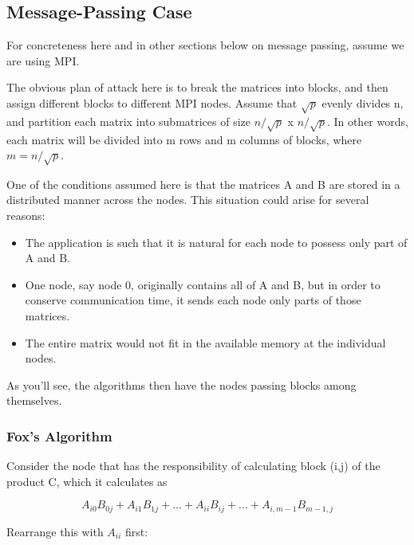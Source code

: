 \subsection{Message-Passing Case}

For concreteness here and in other sections below on message passing,
assume we are using MPI.

The obvious plan of attack here is to break the matrices into blocks,
and then assign different blocks to different MPI nodes.  Assume that
$\sqrt{p}$ evenly divides n, and partition each matrix into submatrices of
size $n/\sqrt{p}$ x $n/\sqrt{p}$.  In other words, each matrix will be
divided into m rows and m columns of blocks, where $m = n/\sqrt{p}$.

One of the conditions assumed here is that the matrices A and B are
stored in a distributed manner across the nodes.  This situation could
arise for several reasons:

\begin{itemize}

   \item The application is such that it is natural for each node to
   possess only part of A and B.

   \item One node, say node 0, originally contains all of A and B, but
   in order to conserve communication time, it sends each node only
   parts of those matrices.

   \item The entire matrix would not fit in the available memory at the
   individual nodes.

\end{itemize}

As you'll see, the algorithms then have the nodes passing blocks among
themselves.

\subsubsection{Fox's Algorithm}
\label{matmult}

Consider the node that has the responsibility of calculating block (i,j) 
of the product C, which it calculates as

\begin{equation}
A_{i0} B_{0j} + A_{i1} B_{1j} + ... + A_{ii} B_{ij} + ...
+ A_{i,m-1} B_{m-1,j}
\end{equation}

Rearrange this with $A_{ii}$ first:

